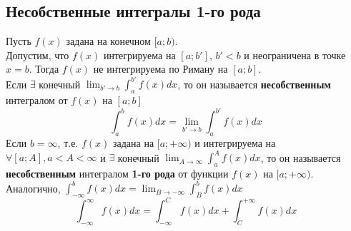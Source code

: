 \documentclass[12pt]{article}
\begin{document}
    \subsection{Несобственные интегралы 1-го рода}\noindent
    Пусть $f(x)$ задана на конечном $[a;b)$.\\
    Допустим, что $f(x)$ интегрируема на $[a;b']$, $b'<b$ и неограничена в точке $x=b$. Тогда $f(x)$ не интегрируема по Риману на $[a;b]$.\\
    Если $\exists$ конечный $\lim_{b' \to b} \int_{a}^{b'}f(x)dx$, то он называется \textbf{несобственным} интегралом от $f(x)$ на $[a; b]$
    \[ \int_{a}^{b}f(x)dx=\lim_{b' \to b}\int_{a}^{b'} f(x)dx \]
    Если $b=\infty$, т.е. $f(x)$ задана на $[a; +\infty)$ и интегрируема на $\forall [a;A],a<A<\infty$ и $\exists$ конечный $\lim_{A \to \infty}\int_{a}^{A} f(x)dx$, то он называется \textbf{несобственным} интегралом \textbf{1-го рода} от функции $f(x)$ на $[a;+\infty)$.\\
    Аналогично, $\int_{-\infty}^{b}f(x)dx=\lim_{B \to -\infty} \int_{B}^{b}f(x)dx$\\
    \[ \int_{-\infty}^{\infty} f(x)dx=\int_{-\infty}^{C}f(x)dx+\int_{C}^{+\infty}f(x)dx \]
\end{document}
